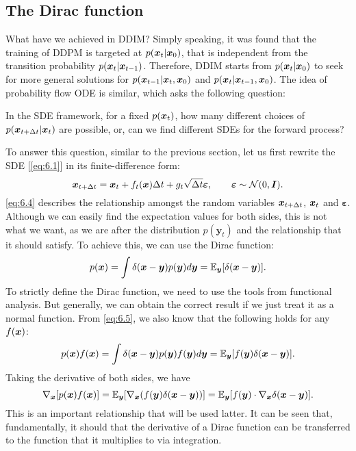 \subsection{The Dirac function}

What have we achieved in DDIM? Simply speaking, it was found that the training of DDPM is targeted at $p(\bm{x}_{t}|\bm{x}_0)$, that is independent from the transition probability $p(\bm{x}_{t}|\bm{x}_{t-1})$. Therefore, DDIM starts from $p(\bm{x}_{t}|\bm{x}_0)$ to seek for more general solutions for $p(\bm{x}_{t-1}|\bm{x}_{t},\bm{x}_0)$ and $p(\bm{x}_{t}|\bm{x}_{t-1},\bm{x}_0)$. The idea of probability flow ODE is similar, which asks the following question:
\begin{myquote}
    In the SDE framework, for a fixed $p(\bm{x}_{t})$, how many different choices of $p(\bm{x}_{t+\Delta t}|\bm{x}_{t})$ are possible, or, can we find different SDEs for the forward process?
\end{myquote}

To answer this question, similar to the previous section, let us first rewrite the SDE [\cref{eq:6.1}] in its finite-difference form:
\begin{equation}
    \label{eq:6.4}
    \bm{x}_{t+\Delta t} = \bm{x}_{t} + f_t(\bm{x})\Delta t + g_t\sqrt{\Delta t}\bm{\varepsilon},\qquad\bm{\varepsilon}\sim\mathcal{N}(0,\bm{I}).
\end{equation}
\cref{eq:6.4} describes the relationship amongst the random variables $\bm{x}_{t+\Delta t}$, $\bm{x}_{t}$ and $\bm{\varepsilon}$. Although we can easily find the expectation values for both sides, this is not what we want, as we are after the distribution $p(\bm{y}_t)$ and the relationship that it should satisfy.  To achieve this, we can use the Dirac function:
\begin{equation}
    \label{eq:6.5}
    p(\bm{x})=\int \delta(\bm{x}-\bm{y})p(\bm{y})d\bm{y} =\mathbb{E}_{\bm{y}}[\delta(\bm{x}-\bm{y})].
\end{equation}
To strictly define the Dirac function, we need to use the tools from functional analysis. But generally, we can obtain the correct result if we just treat it as a normal function. From \cref{eq:6.5}, we also know that the following holds for any $f(\bm{x})$:
\begin{equation}
    \label{eq:6.6}
    p(\bm{x})f(\bm{x})=\int\delta(\bm{x}-\bm{y})p(\bm{y}) f(\bm{y})d\bm{y} = \mathbb{E}_{\bm{y}}[f(\bm{y}) \delta(\bm{x}-\bm{y})].
\end{equation}
Taking the derivative of both sides, we have
\begin{equation}
    \label{eq:6.7}
    \nabla_{\bm{x}} [p(\bm{x})f(\bm{x})] =  \mathbb{E}_{\bm{y}}[\nabla_{\bm{x}} (f(\bm{y}) \delta(\bm{x}-\bm{y}))] = \mathbb{E}_{\bm{y}}[f(\bm{y}) \cdot \nabla_{\bm{x}} \delta(\bm{x}-\bm{y})].
\end{equation}
This is an important relationship that will be used latter. It can be seen that, fundamentally, it should that the derivative of a Dirac function can be transferred to the function that it multiplies to via integration. 


